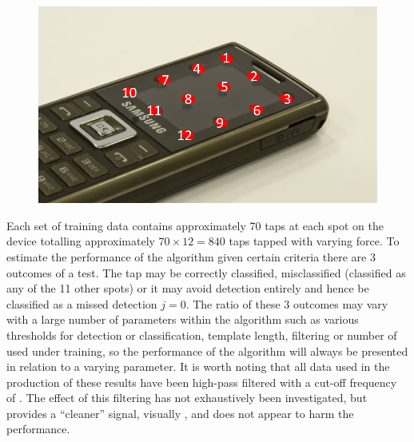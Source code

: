 \DIFaddbegin \begin{figure}[!]
\centering
\includegraphics[width=300 px]{phoneDisplayNum.png}
\caption{}\label{fig:phoneDisplayNum}
\end{figure}


\DIFaddend Each set of training data contains approximately 70 taps\DIFaddbegin \label{corrections:DSNcount} \DIFaddend at each spot on the device totalling approximately $70 \times 12 = 840$ taps tapped with varying force. To estimate the performance of the algorithm given certain criteria there are 3 outcomes of a test. The tap may be correctly classified, misclassified (classified as any of the 11 other spots) or it may avoid detection entirely and hence be classified as a missed detection $j=0$. The ratio of these 3 outcomes may vary with a large number of parameters within the algorithm such as various thresholds for detection or classification, template length, filtering or number of \DIFdelbegin {}\DIFdelend \DIFaddbegin {}\DIFaddend used under training, so the performance of the algorithm will always be presented in relation to a varying parameter. It is worth noting that all data used in the production of these results have been high-pass filtered with a cut-off frequency of \DIFdelbegin {}\DIFdelend \DIFaddbegin {}\label{corrections:cut-off}\DIFadd{)}\DIFaddend . The effect of this filtering has not exhaustively been investigated, but provides a ``cleaner'' signal, visually \DIFaddbegin {}\DIFaddend , and does not appear to harm the performance. \DIFaddbegin {}\DIFaddend

